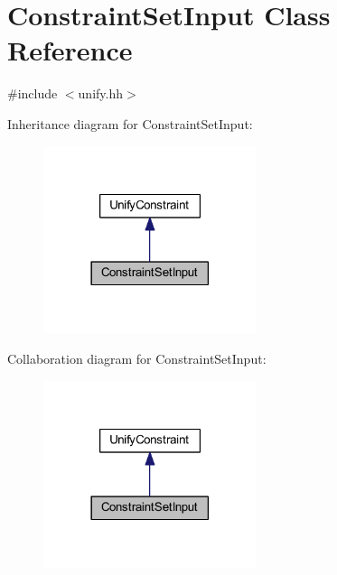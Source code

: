 \hypertarget{class_constraint_set_input}{}\section{Constraint\+Set\+Input Class Reference}
\label{class_constraint_set_input}


{\ttfamily \#include $<$unify.\+hh$>$}



Inheritance diagram for Constraint\+Set\+Input\+:
\nopagebreak
\begin{figure}[H]
\begin{center}
\leavevmode
\includegraphics[width=177pt]{class_constraint_set_input__inherit__graph}
\end{center}
\end{figure}


Collaboration diagram for Constraint\+Set\+Input\+:
\nopagebreak
\begin{figure}[H]
\begin{center}
\leavevmode
\includegraphics[width=177pt]{class_constraint_set_input__coll__graph}
\end{center}
\end{figure}
